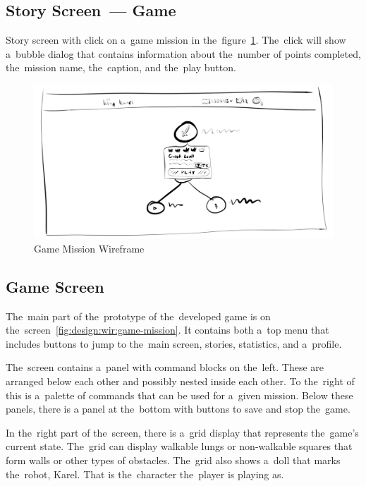 \subsection{Story Screen~--- Game}

Story screen with click on a~game mission in the~figure~\ref{fig:design:wir:story-game}.
The~click will show a~bubble dialog that contains information about the~number of points completed, the~mission name, the~caption, and the~play button.

\begin{figure}
    \centering
    \includegraphics[width=1\linewidth]{assets/design/ui/wir_game.png}
    \caption{Game Mission Wireframe}
    \label{fig:design:wir:story-game}
\end{figure}

\subsection{Game Screen}

The~main part of the~prototype of the~developed game is on the~screen~\ref{fig:design:wir:game-mission}.
It contains both a~top menu that includes buttons to jump to the~main screen, stories, statistics, and a~profile.

The~screen contains a~panel with command blocks on the~left.
These are arranged below each other and possibly nested inside each other.
To the~right of this is a~palette of commands that can be used for a~given mission.
Below these panels, there is a panel at the~bottom with buttons to save and stop the~game.

In the~right part of the~screen, there is a~grid display that represents the~game's current state.
The~grid can display walkable lungs or non-walkable squares that form walls or other types of obstacles.
The~grid also shows a~doll that marks the~robot, Karel.
That is the~character the~player is playing as.

